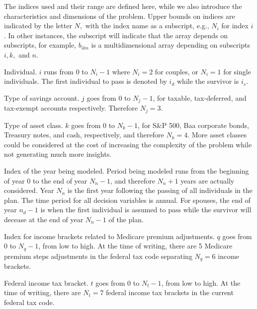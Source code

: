 \documentclass{report}[fleqn,11pt]
\begin{document}
The indices used and their range are defined here, while we also
introduce the characteristics and dimensions of the problem.
Upper bounds on indices are indicated by the letter $N,$ with the
index name as a subscript, e.g., $N_i$ for index $i$. In other instances,
the subscript will indicate that the array depends on subscripts, for example,
$b_{ikn}$ is a multidimensional array depending on subscripts $i, k,$ and $n$.
\begin{description}[leftmargin=4em,style=multiline]
\item [$i$]
	Individual. $i$ runs from 0 to $N_i - 1$ where $N_i = 2$ for couples,
	or $N_i= 1$ for single individuals. The first individual to pass
	is denoted by $i_d$ while the survivor is $i_s$.
\item [$j$]
	Type of savings account. $j$ goes from 0 to $N_j - 1$, for taxable, tax-deferred,
	and tax-exempt accounts respectively. Therefore $N_j = 3$.
\item[$k$]
	Type of asset class. $k$ goes from 0 to $N_k -1 $, for S\&P 500,
	Baa corporate bonds, Treasury notes, and cash, respectively,
        and therefore $N_k = 4$.
	More asset classes could be considered at the cost of increasing
	the complexity of the problem while not generating much more insights.
\item [$n$]
	Index of the year being modeled. Period being modeled runs from the beginning of year 0 to 
	the end of year $N_n-1$, and therefore $N_n + 1$ years are actually considered.
	Year $N_n$ is the first year following the passing of all
	individuals in the plan. The time period for all decision variables is annual.
	For spouses, the end of year $n_d-1$ is when the first individual is assumed to pass while
	the survivor will decease at the end of year $N_n-1$ of the plan.
\item [$q$]
	Index for income brackets related to Medicare premium adjustments.
	$q$ goes from 0 to $N_q - 1$, from low to high.
	At the time of writing, there are 5 Medicare premium steps adjustments
        in the federal tax code separating $N_q = 6$ income brackets.
\item [$t$]
	Federal income tax bracket. $t$ goes from 0 to $N_t - 1$, from low to high.
	At the time of writing, there are $N_t = 7$ federal income tax brackets in the current federal tax code.
\end{description}
\end{document}

